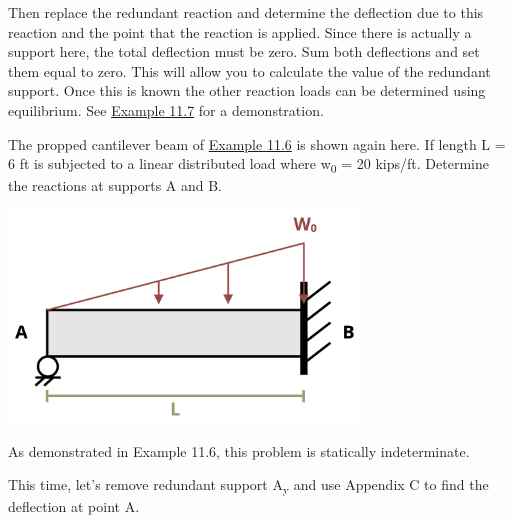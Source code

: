 \documentclass[
  letterpaper,
  DIV=11,
  numbers=noendperiod]{scrreprt}
\theoremstyle{definition}
\theoremstyle{remark}
\begin{document}
Then replace the redundant reaction and determine the deflection due to
this reaction and the point that the reaction is applied. Since there is
actually a support here, the total deflection must be zero. Sum both
deflections and set them equal to zero. This will allow you to calculate
the value of the redundant support. Once this is known the other
reaction loads can be determined using equilibrium. See
\hyperref[example-11.7]{Example 11.7} for a demonstration.

\begin{tcolorbox}[enhanced jigsaw, leftrule=.75mm, colbacktitle=quarto-callout-tip-color!10!white, breakable, opacityback=0, colback=white, titlerule=0mm, toprule=.15mm, colframe=quarto-callout-tip-color-frame, coltitle=black, title={Example 11.7}, toptitle=1mm, bottomrule=.15mm, rightrule=.15mm, left=2mm, arc=.35mm, opacitybacktitle=0.6, bottomtitle=1mm]

The propped cantilever beam of \hyperref[example-11.6]{Example 11.6} is
shown again here. If length L = 6 ft is subjected to a linear
distributed load where w\textsubscript{0} = 20 kips/ft. Determine the
reactions at supports A and B.

\begin{center}
\includegraphics[width=3.65625in,height=\textheight]{images/CH11 PNGs/example11.7-1.png}
\end{center}

\begin{tcolorbox}[enhanced jigsaw, leftrule=.75mm, colbacktitle=quarto-callout-tip-color!10!white, breakable, opacityback=0, colback=white, titlerule=0mm, toprule=.15mm, colframe=quarto-callout-tip-color-frame, coltitle=black, title={Solution}, toptitle=1mm, bottomrule=.15mm, rightrule=.15mm, left=2mm, arc=.35mm, opacitybacktitle=0.6, bottomtitle=1mm]

As demonstrated in Example 11.6, this problem is statically
indeterminate.

This time, let's remove redundant support A\textsubscript{y} and use
Appendix C to find the deflection at point A.


\end{tcolorbox}
\end{tcolorbox}
\end{document}
